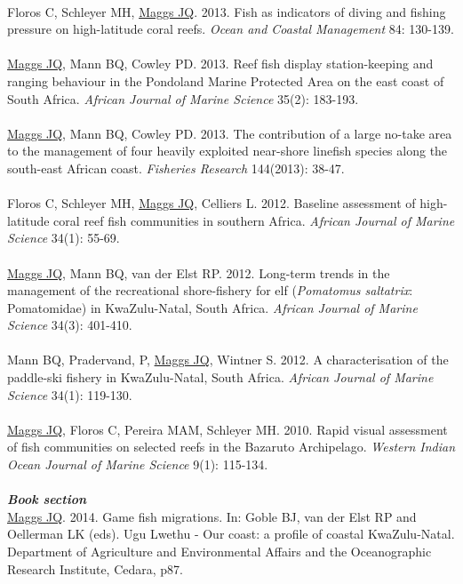 \documentclass[10pt,a4paper]{article}
\begin{document}
\\
Floros C, Schleyer MH, \underline{Maggs JQ}. 2013. Fish as indicators of diving and fishing pressure on high-latitude coral reefs. \textit{Ocean and Coastal Management} 84: 130-139.\\
\\ 
\underline{Maggs JQ}, Mann BQ, Cowley PD. 2013. Reef fish display station-keeping and ranging behaviour in the Pondoland Marine Protected Area on the east coast of South Africa. \textit{African Journal of Marine Science} 35(2): 183-193.\\
\\
\underline{Maggs JQ}, Mann BQ, Cowley PD. 2013. The contribution of a large no-take area to the management of four heavily exploited near-shore linefish species along the south-east African coast. \textit{Fisheries Research} 144(2013): 38-47.\\
\\
Floros C, Schleyer MH, \underline{Maggs JQ}, Celliers L. 2012. Baseline assessment of high-latitude coral reef fish communities in southern Africa. \textit{African Journal of Marine Science} 34(1): 55-69.\\
\\
\underline{Maggs JQ}, Mann BQ, van der Elst RP. 2012. Long-term trends in the management of the recreational shore-fishery for elf (\textit{Pomatomus saltatrix}: Pomatomidae) in KwaZulu-Natal, South Africa. \textit{African Journal of Marine Science} 34(3): 401-410.\\
\\
Mann BQ, Pradervand, P, \underline{Maggs JQ}, Wintner S. 2012. A characterisation of the paddle-ski fishery in KwaZulu-Natal, South Africa. \textit{African Journal of Marine Science} 34(1): 119-130.\\
\\
\underline{Maggs JQ}, Floros C, Pereira MAM, Schleyer MH. 2010. Rapid visual assessment of fish communities on selected reefs in the Bazaruto Archipelago. \textit{Western Indian Ocean Journal of Marine Science} 9(1): 115-134.\\	
\\
\textit{\textbf{Book section}}\\
\underline{Maggs JQ}. 2014. Game fish migrations. In: Goble BJ, van der Elst RP and Oellerman LK (eds). Ugu Lwethu - Our coast: a profile of coastal KwaZulu-Natal. Department of Agriculture and Environmental Affairs and the Oceanographic Research Institute, Cedara, p87.\\
\\
\end{document}
